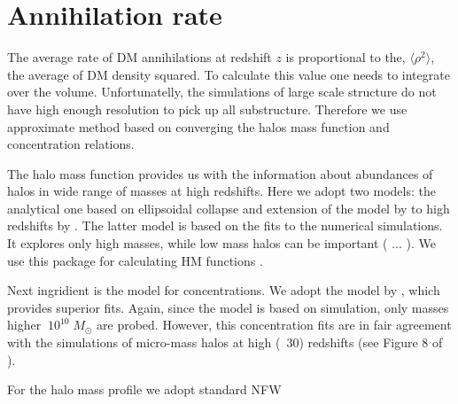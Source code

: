 \section{Annihilation rate}

The average rate of DM annihilations at redshift $z$ is proportional to the, $\langle \rho^2 \rangle$, the average of DM density squared. To calculate this value one needs to integrate over the volume. Unfortunatelly, the simulations of large scale structure do not have high enough resolution to pick up all substructure. Therefore we use approximate method based on converging the halos mass function and concentration relations.

The halo mass function provides us with the information about abundances of halos in wide range of masses at high redshifts. Here we adopt two models: the analytical one based on ellipsoidal collapse \cite{Sheth_2001} and extension of the model by \cite{Tinker_2008} to high redshifts by \cite{Behroozi_2013}. The latter model is based on the fits to the numerical simulations. It explores only high masses, while low mass halos can be important ( ... ). We use this package for calculating HM functions \cite{Murray_2013}.

Next ingridient is the model for concentrations. We adopt the model by \cite{2014arXiv1407.4730D}, which provides superior fits. Again, since the model is based on simulation, only masses higher $~10^{10}\;M_\odot$ are probed. However, this concentration fits are in fair agreement with the simulations of micro-mass halos at high (~30) redshifts (see Figure 8 of \cite{2014arXiv1407.4730D}).

For the halo mass profile we adopt standard NFW \cite{1997ApJ...490..493N}

